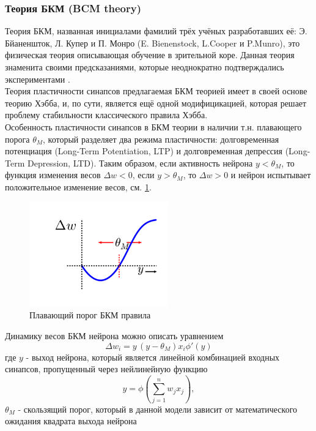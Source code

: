 \documentclass[a4paper,10pt]{article}
\begin{document}
\subsubsection{Теория БКМ (BCM theory)}
\indent Теория БКМ, названная инициалами фамилий трёх учёных разработавших её: Э. Бйаненшток, Л. Купер и П. Монро (E. Bienenstock, L.Cooper и P.Munro), это физическая теория описывающая обучение в зрительной коре. Данная теория знаменита своими предсказаниями, которые неоднократно подтверждались экспериментами \cite{Cooper}.\\
\indent Теория пластичности синапсов предлагаемая БКМ теорией имеет в своей основе теорию Хэбба, и, по сути, является ещё одной модифицикацией, которая решает проблему стабильности классического правила Хэбба.\\
\indent Особенность пластичности синапсов в БКМ теории в наличии т.н. плавающего порога $\theta_{M}$, который разделяет два режима пластичности: долговременная потенциация (Long-Term Potentiation, LTP) и долговременная депрессия (Long-Term Depression, LTD). Таким образом, если активность нейрона $y<\theta_{M}$, то функция изменения весов $\Delta w<0$, если $y>\theta_{M}$, то $\Delta w>0$ и нейрон испытывает положительное изменение весов, см. \ref{bcm_pic}.
\begin{figure}[ht]
\centering
\captionsetup{justification=centering,margin=1cm}
\includegraphics[width=60mm,scale=0.2]{bcm.png}
\caption{Плавающий порог БКМ правила}
\label{bcm_pic}
\end{figure}
\FloatBarrier
\indent Динамику весов БКМ нейрона можно описать уравнением
\begin{equation}
\Delta w_{i} = y\,(y - \theta_{M})x_{i}\phi'(y)
\end{equation}
где $y$ - выход нейрона, который является линейной комбинацией входных синапсов, пропущенный через нейлинейную функцию
\begin{equation}
y = \phi(\sum_{j=1}^{n}w_{j}x_{j}),
\end{equation}
$\theta_{M}$ - скользящий порог, который в данной модели зависит от математического ожидания квадрата выхода нейрона 
\end{document}
